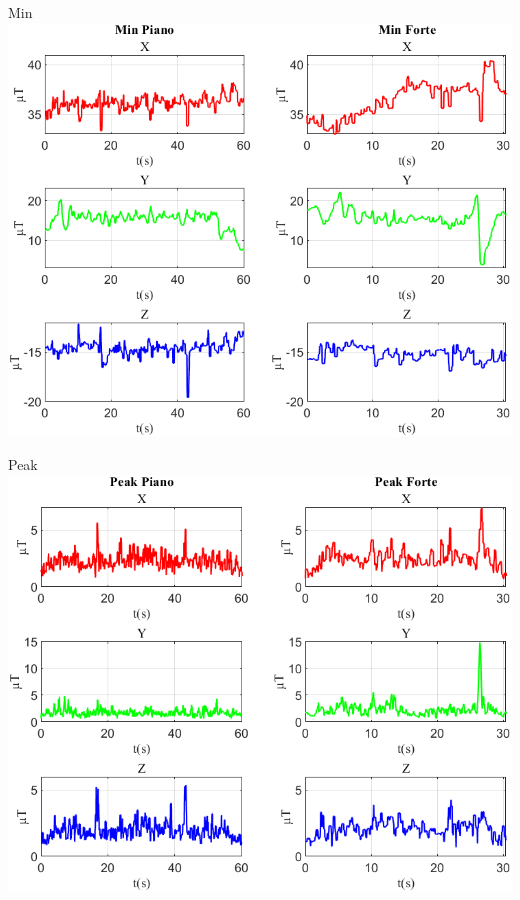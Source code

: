 	\begin{frame}{{Min}}
		\centering\includegraphics[height=.8\textheight]{figure/Mag/Min}
	\end{frame}
	
	\begin{frame}{{Peak}}
		\centering\includegraphics[height=.8\textheight]{figure/Mag/Peak}
	\end{frame}
	
